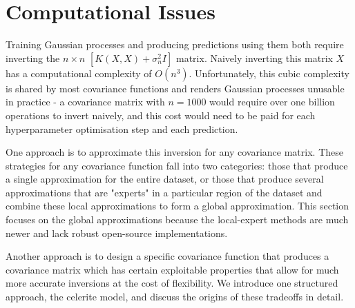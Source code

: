 \section{Computational Issues}
Training Gaussian processes and producing predictions using them both require inverting the $n \times n$ $[K(X,X) + \sigma^2_nI]$ matrix. Naively inverting this matrix $X$ has a computational complexity of $O(n^3)$. Unfortunately, this cubic complexity is shared by most covariance functions and renders Gaussian processes unusable in practice - a covariance matrix with $n = 1000$ would require over one billion operations to invert naively, and this cost would need to be paid for each hyperparameter optimisation step and each prediction. 

One approach is to approximate this inversion for any covariance matrix. These strategies for any covariance function fall into two categories: those that produce a single approximation for the entire dataset, or those that produce several approximations that are "experts" in a particular region of the dataset and combine these local approximations to form a global approximation. This section focuses on the global approximations because the local-expert methods are much newer and lack robust open-source implementations. 

Another approach is to design a specific covariance function that produces a covariance matrix which has certain exploitable properties that allow for much more accurate inversions at the cost of flexibility. We introduce one structured approach, the celerite model, and discuss the origins of these tradeoffs in detail.



